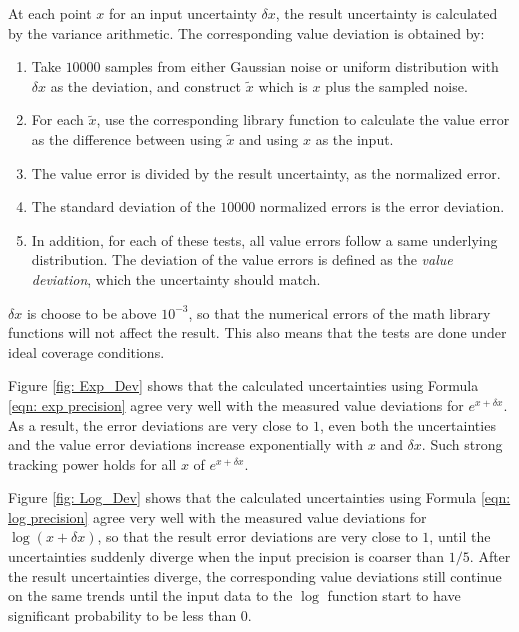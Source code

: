 \documentclass[twoside]{article}
\numberwithin{equation}{section}
\begin{document}
At each point $x$ for an input uncertainty $\delta x$, the result uncertainty is calculated by the variance arithmetic.
The corresponding value deviation is obtained by:
\begin{enumerate}

\item Take $10000$ samples from either Gaussian noise or uniform distribution with $\delta x$ as the deviation, and construct $\tilde{x}$ which is $x$ plus the sampled noise.  

\item For each $\tilde{x}$, use the corresponding library function to calculate the value error as the difference between using $\tilde{x}$ and using $x$ as the input.

\item The value error is divided by the result uncertainty, as the normalized error.

\item The standard deviation of the $10000$ normalized errors is the error deviation.

\item In addition, for each of these tests, all value errors follow a same underlying distribution.
The deviation of the value errors is defined as the \emph{value deviation}, which the uncertainty should match.

\end{enumerate}
$\delta x$ is choose to be above  $10^{-3}$, so that the numerical errors of the math library functions will not affect the result.
This also means that the tests are done under ideal coverage conditions.

Figure \ref{fig: Exp_Dev} shows that the calculated uncertainties using Formula \eqref{eqn: exp precision} agree very well with the measured value deviations for $e^{x + \delta x}$.
As a result, the error deviations are very close to $1$, even both the uncertainties and the value error deviations increase exponentially with $x$ and $\delta x$.
Such strong tracking power holds for all $x$ of $e^{x + \delta x}$. 

Figure \ref{fig: Log_Dev} shows that the calculated uncertainties using Formula \eqref{eqn: log precision} agree very well with the measured value deviations for $\log(x + \delta x)$, so that the result error deviations are very close to $1$, until the uncertainties suddenly diverge when the input precision is coarser than $1/5$.
After the result uncertainties diverge, the corresponding value deviations still continue on the same trends until the input data to the $\log$ function start to have significant probability to be less than $0$.
\end{document}
